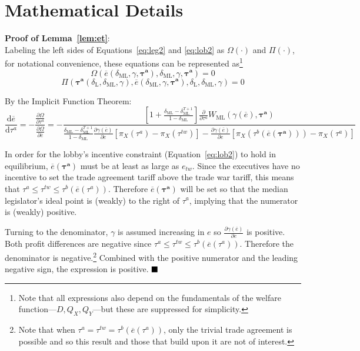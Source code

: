 \documentclass[authoryear, review]{elsarticle}
\newcommand{\ov}{\overline}
\newcommand{\bta}{\bm{\tau^a}}
\newcommand{\ga}{\gamma}
\newcommand{\de}{\delta}
\begin{document}
\section{Mathematical Details}
\noindent \textbf{\hypertarget{Cor_et}{Proof of Lemma~\ref{lem:et}}}: \\
Labeling the left sides of Equations~\ref{eq:leg2} and \ref{eq:lob2} as $\Omega\left(\cdot\right)$ and $\Pi\left(\cdot\right)$, for notational convenience, these equations can be represented as\footnote{Note that all expressions also depend on the fundamentals of the welfare function---$D,Q_X,Q_Y$---but these are suppressed for simplicity.}
\begin{equation}
  \Omega\left(\ov{e}\left(\de_\text{ML},\ga,\bta \right),\de_\text{ML},\ga,\bta \right) = 0
	\label{eq:leg3}
\end{equation}
\begin{equation}
  \Pi\left(\bta\left(\de_\text{L},\de_\text{ML},\ga\right),\ov{e}\left(\de_\text{ML},\ga,\bta\right),\de_\text{L},\de_\text{ML},\ga \right) = 0
  \label{eq:lob3}
\end{equation}


By the Implicit Function Theorem:
\begin{equation}
 	\frac{\mathrm{d} \ov{e}}{\mathrm{d} \tau^a} = -\frac{\frac{\partial \Omega}{\partial \tau^a}}{\frac{\partial \Omega}{\partial \ov{e}}} = -
	\textstyle \frac{\left[1+ \frac{\de_\text{ML} - \de_\text{ML}^{T+1}}{1-\de_\text{ML}}  \right]\frac{\partial}{\partial \tau^a}W_\text{ML}(\ga(\ov{e}),\bta)} {\frac{\de_\text{ML} - \de_\text{ML}^{T+1}}{1-\de_\text{ML}}\frac{\partial \ga(\ov{e})}{\partial e}\left[ \pi_X(\tau^a) - \pi_X(\tau^{tw}) \right] - \frac{\partial \ga(\ov{e})}{\partial e}\left[ \pi_X(\tau^b(\ov{e}(\bta))) - \pi_X(\tau^{a}) \right]}
	\label{eq:coret}
\end{equation}

\noindent In order for the lobby's incentive constraint (Equation~\ref{eq:lob2}) to hold in equilibrium, $\ov{e}(\bta)$ must be at least as large as $e_{tw}$. Since the executives have no incentive to set the trade agreement tariff above the trade war tariff, this means that $\tau^a \leq \tau^{tw} \leq \tau^b(\ov{e}(\tau^a))$. Therefore $\ov{e}(\bta)$ will be set so that the median legislator's ideal point is (weakly) to the right of $\tau^a$, implying that the numerator is (weakly) positive.

Turning to the denominator, $\ga$ is assumed increasing in $e$ so $\frac{\partial \ga(\ov{e})}{\partial e}$ is positive. Both profit differences are negative since $\tau^a \leq \tau^{tw} \leq \tau^b(\ov{e}(\tau^a))$. Therefore the denominator is negative.\footnote{Note that when $\tau^a = \tau^{tw} = \tau^b(\ov{e}(\tau^a))$, only the trivial trade agreement is possible and so this result and those that build upon it are not of interest.} Combined with the positive numerator and the leading negative sign, the expression is positive. $\hfill\blacksquare$
\end{document}

